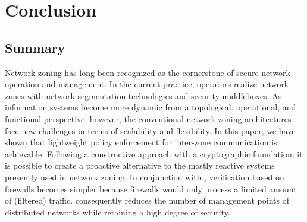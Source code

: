 \chapter{Conclusion}
\label{concl}

\section{Summary}
\label{ssummary}

Network zoning has long been recognized as the cornerstone of secure network operation and management.
In the current practice, operators realize network zones with network segmentation technologies and security middleboxes.  
As information systems become more dynamic from a topological, operational, and functional perspective, however, the conventional network-zoning architectures face new challenges in terms of scalability and flexibility.
In this paper, we have shown that lightweight policy enforcement for inter-zone communication
is achievable. 
Following a constructive approach with a cryptographic foundation, it is possible to create a proactive alternative to the mostly reactive systems presently used in network zoning.
In conjunction with \name, verification based on firewalls becomes simpler because firewalls would only process a limited amount of (filtered) traffic.
\name consequently reduces the number of management points of distributed networks while retaining a high degree of security.


